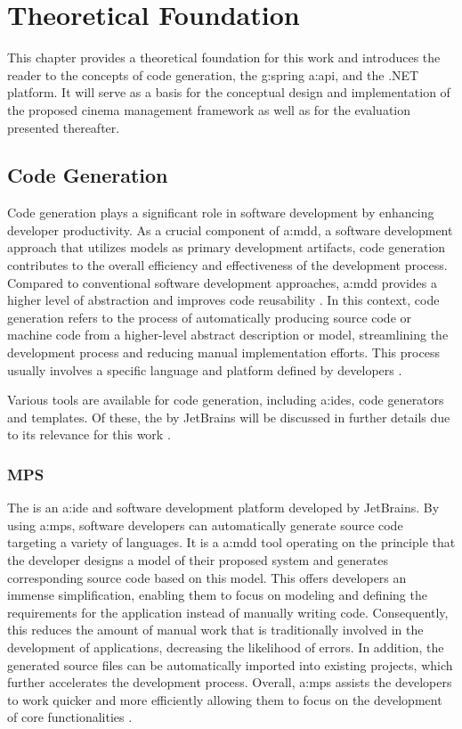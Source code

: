\chapter{Theoretical Foundation}
\label{ch:foundation}

This chapter provides a theoretical foundation for this work and introduces the reader to the concepts of code generation, the \gls{g:spring} \gls{a:api}, and the .NET platform. It will serve as a basis for the conceptual design and implementation of the proposed cinema management framework as well as for the evaluation presented thereafter.

\section{Code Generation}

Code generation plays a significant role in software development by enhancing developer productivity. As a crucial component of \gls{a:mdd}, a software development approach that utilizes models as primary development artifacts, code generation contributes to the overall efficiency and effectiveness of the development process. Compared to conventional software development approaches, \gls{a:mdd} provides a higher level of abstraction and improves code reusability \cite{voelter2017model}. In this context, code generation refers to the process of automatically producing source code or machine code from a higher-level abstract description or model, streamlining the development process and reducing manual implementation efforts. This process usually involves a specific language and platform defined by developers \cite{greenfield2002code}.

Various tools are available for code generation, including \glspl{a:ide}, code generators and templates. Of these, the  by JetBrains will be discussed in further details due to its relevance for this work \cite{biermann2017model}.

\subsection{MPS}

The  is an \gls{a:ide} and software development platform developed by JetBrains. By using \gls{a:mps}, software developers can automatically generate source code targeting a variety of languages. It is a \gls{a:mdd} tool operating on the principle that the developer designs a model of their proposed system and generates corresponding source code based on this model. This offers developers an immense simplification, enabling them to focus on modeling and defining the requirements for the application instead of manually writing code. Consequently, this reduces the amount of manual work that is traditionally involved in the development of applications, decreasing the likelihood of errors. In addition, the generated source files can be automatically imported into existing projects, which further accelerates the development process. Overall, \gls{a:mps} assists the developers to work quicker and more efficiently allowing them to focus on the development of core functionalities \cite{voelter2013study}.


